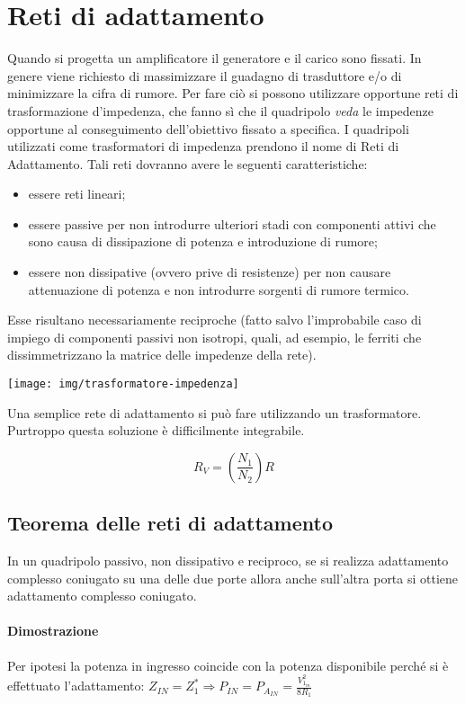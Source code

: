 \section{Reti di adattamento}
Quando si progetta un amplificatore il generatore e il carico sono fissati. In genere viene richiesto di	massimizzare il guadagno di trasduttore e/o di minimizzare la cifra di rumore.	Per fare ciò si possono utilizzare opportune reti di trasformazione d'impedenza, che fanno sì che il quadripolo \textit{veda} le impedenze opportune al conseguimento dell'obiettivo fissato a specifica. I quadripoli utilizzati come trasformatori di impedenza prendono il nome di Reti di Adattamento.
Tali reti dovranno avere le seguenti caratteristiche:
\begin{itemize}
	\item essere reti lineari;
	\item essere passive per non introdurre ulteriori stadi con componenti attivi che sono causa di dissipazione di potenza e introduzione di rumore;
	\item essere non dissipative (ovvero prive di resistenze) per non causare attenuazione di potenza e non introdurre sorgenti di rumore termico.
\end{itemize}

Esse risultano necessariamente reciproche (fatto salvo l'improbabile caso di impiego di componenti passivi non isotropi, quali, ad esempio, le ferriti che dissimmetrizzano la matrice delle
impedenze della rete).

\begin{multicols}{2}
	\texttt{[image: img/trasformatore-impedenza]}
	
	Una semplice rete di adattamento si può fare utilizzando un trasformatore. Purtroppo questa soluzione è difficilmente integrabile.
	
	$$R_V = \left( \frac{N_1}{N_2} \right) R$$
	
\end{multicols}

\subsection{Teorema delle reti di adattamento}
In un quadripolo passivo, non dissipativo e reciproco, se si realizza adattamento complesso coniugato su una delle due porte allora anche sull'altra porta si ottiene adattamento complesso coniugato.

\paragraph{Dimostrazione}
Per ipotesi la potenza in ingresso coincide con la potenza disponibile perché si è effettuato l'adattamento:
$Z_{IN} = Z_1^* \Rightarrow
P_{IN} = P_{A_{IN}} = \frac{V_{1_m}^2}{8R_1}$

